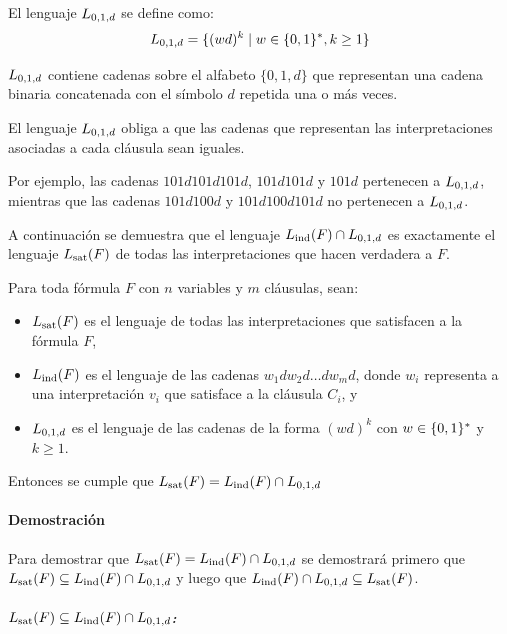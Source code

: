 \begin{definition}
    El lenguaje $L_{0,1,d}$ se define como:
    $$
        L_{0,1,d} = \{ (wd)^k \;|\; w \in \{0, 1\}^*, k \geq 1 \}
    $$

    $L_{0,1,d}$ contiene cadenas sobre el alfabeto $\{0, 1, d\}$ que representan una cadena binaria concatenada con el símbolo $d$ repetida una o más veces.
\end{definition}



El lenguaje $L_{0,1,d}$ obliga a que las cadenas que representan las interpretaciones asociadas a cada cláusula sean iguales.

Por ejemplo, las cadenas $101d101d101d$, $101d101d$ y $101d$ pertenecen a $L_{0,1,d}$, mientras que las cadenas $101d100d$ y $101d100d101d$ no pertenecen a $L_{0,1,d}$.

A continuación se demuestra que el lenguaje $L_{\mathrm{ind}}(F) \cap L_{0,1,d}$ es exactamente el lenguaje $L_{\mathrm{sat}}(F)$ de todas las interpretaciones que hacen verdadera a $F$.

\begin{theorem}
    \label{thm:lv-intersection}
    Para toda fórmula $F$ con $n$ variables y $m$ cláusulas, sean:
    \begin{itemize}
        \item $L_{\mathrm{sat}}(F)$ es el lenguaje de todas las interpretaciones que satisfacen a la fórmula $F$,
        \item $L_{\mathrm{ind}}(F)$ es el lenguaje de las cadenas $w_1d w_2d \ldots d w_md$, donde $w_i$ representa a una interpretación $v_i$ que satisface a la cláusula $C_i$, y
        \item $L_{0,1,d}$ es el lenguaje de las cadenas de la forma $(wd)^k$ con $w \in \{0, 1\}^*$ y $k \geq 1$.
    \end{itemize}
    Entonces se cumple que $L_{\mathrm{sat}}(F) = L_{\mathrm{ind}}(F) \cap L_{0,1,d}$
\end{theorem}

\paragraph{Demostración}

Para demostrar que $L_{\mathrm{sat}}(F) = L_{\mathrm{ind}}(F) \cap L_{0,1,d}$ se demostrará primero que $L_{\mathrm{sat}}(F) \subseteq L_{\mathrm{ind}}(F) \cap L_{0,1,d}$ y luego que $L_{\mathrm{ind}}(F) \cap L_{0,1,d} \subseteq L_{\mathrm{sat}}(F)$.

\subparagraph{$L_{\mathrm{sat}}(F) \subseteq L_{\mathrm{ind}}(F) \cap L_{0,1,d}$:}

